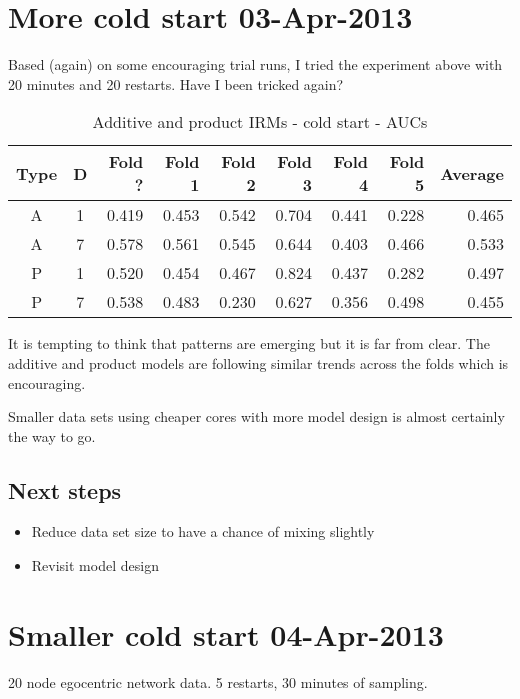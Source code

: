 \documentclass[twoside,11pt]{article}
\begin{document}
\section{More cold start 03-Apr-2013}

Based (again) on some encouraging trial runs, I tried the experiment above with 20 minutes and 20 restarts.
Have I been tricked again?

\begin{table*}[ht!]
\caption{{\small
Additive and product IRMs - cold start - AUCs
}}
\label{tbl:IRM 03-Apr-2013}
\begin{center}
\begin{tabular}{c c | r | r r r r r | r}
Type & D & Fold ? & Fold 1 & Fold 2 & Fold 3 & Fold 4 & Fold 5 & Average \\
\hline
A & 1 & 0.419 & 0.453 & 0.542 & 0.704 & 0.441 & 0.228 & 0.465\\
A & 7 & 0.578 & 0.561 & 0.545 & 0.644 & 0.403 & 0.466 & 0.533\\
P & 1 & 0.520 & 0.454 & 0.467 & 0.824 & 0.437 & 0.282 & 0.497\\
P & 7 & 0.538 & 0.483 & 0.230 & 0.627 & 0.356 & 0.498 & 0.455\\
\end{tabular}
\end{center}
\end{table*}

It is tempting to think that patterns are emerging but it is far from clear.
The additive and product models are following similar trends across the folds which is encouraging.

Smaller data sets using cheaper cores with more model design is almost certainly the way to go.

\subsection{Next steps}

\begin{itemize}
\item Reduce data set size to have a chance of mixing slightly
\item Revisit model design
\end{itemize}

\section{Smaller cold start 04-Apr-2013}

20 node egocentric network data.
5 restarts, 30 minutes of sampling.
\end{document}
